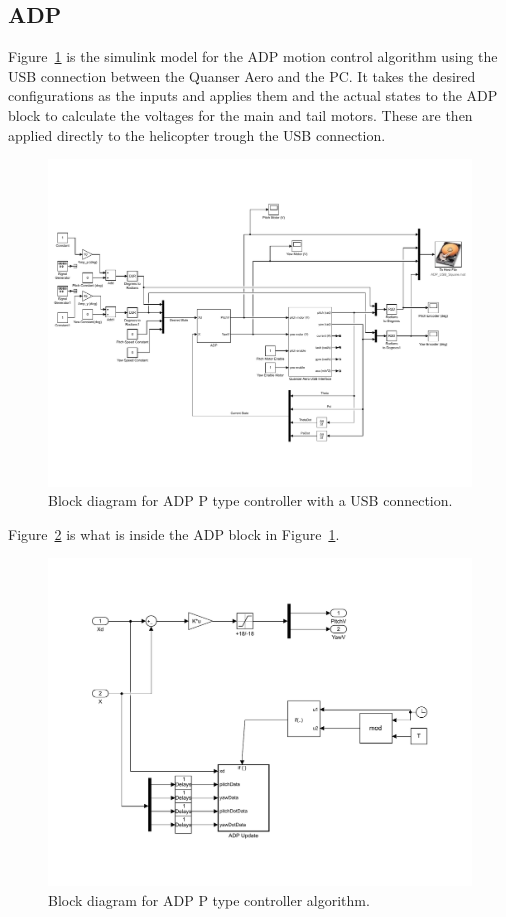\subsection{ADP}
Figure~\ref{fig:ADP_P_USB_Block_Diagram} is the simulink model for the ADP motion control algorithm using the USB connection between the Quanser Aero and the PC.  It takes the desired configurations as the inputs and applies them and the actual states to the ADP block to calculate the voltages for the main and tail motors.  These are then applied directly to the helicopter trough the USB connection.
\begin{figure}[!htbp]
    \centering
    \includegraphics[width=.8\textwidth,keepaspectratio=true]{figs/img/ADP_USB}
    \caption{Block diagram for ADP P type controller with a USB connection.}
    \label{fig:ADP_P_USB_Block_Diagram}
\end{figure}
Figure~\ref{fig:ADP_P_BlackBox} is what is inside the ADP block in Figure~\ref{fig:ADP_P_USB_Block_Diagram}.
\begin{figure}[!htbp]
    \centering
    \includegraphics[width=.8\textwidth,keepaspectratio=true]{figs/img/ADP_Black_Box}
    \caption{Block diagram for ADP P type controller algorithm.}
    \label{fig:ADP_P_BlackBox}
\end{figure}

